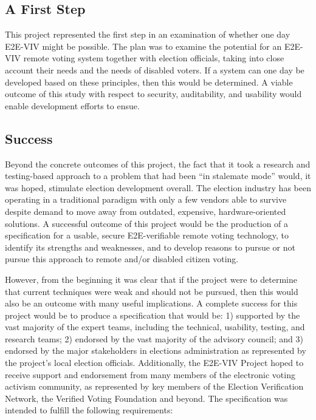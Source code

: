 \subsection{A First Step}
\label{sec:first-step}

This project represented the first step in an examination of whether
one day E2E-VIV might be possible. The plan was to examine the
potential for an E2E-VIV remote voting system together with election
officials, taking into close account their needs and the needs of
disabled voters. If a system can one day be developed based on these
principles, then this would be determined. A viable outcome of this
study with respect to security, auditability, and usability would
enable development efforts to ensue.

\subsection{Success}
\label{sec:success}

Beyond the concrete outcomes of this project, the fact that it 
took a research and testing-based approach to a problem that
had been ``in stalemate mode'' would, it was hoped, stimulate election
development overall. The election industry has been operating in a
traditional paradigm with only a few vendors able to survive despite
demand to move away from outdated, expensive, hardware-oriented
solutions. A successful outcome of this project would be the production of a
specification for a usable, secure E2E-verifiable remote voting
technology, to identify its strengths and weaknesses, and to develop
reasons to pursue or not pursue this approach to remote and/or
disabled citizen voting. 

However, from the beginning it was clear that
if the project were to determine that current techniques were weak and
should not be pursued, then this would also be an outcome with many
useful implications. A complete success for this project would be to
produce a specification that would be: 1) supported by the vast majority of
the expert teams, including the technical, usability, testing, and
research teams; 2) endorsed by the vast majority of the advisory
council; and 3) endorsed by the major stakeholders in elections
administration as represented by the project's local election
officials. Additionally, the E2E-VIV Project hoped to receive support
and endorsement from many members of the electronic voting activism
community, as represented by key members of the Election Verification
Network, the Verified Voting Foundation and beyond. The specification was
intended to fulfill the following requirements:

